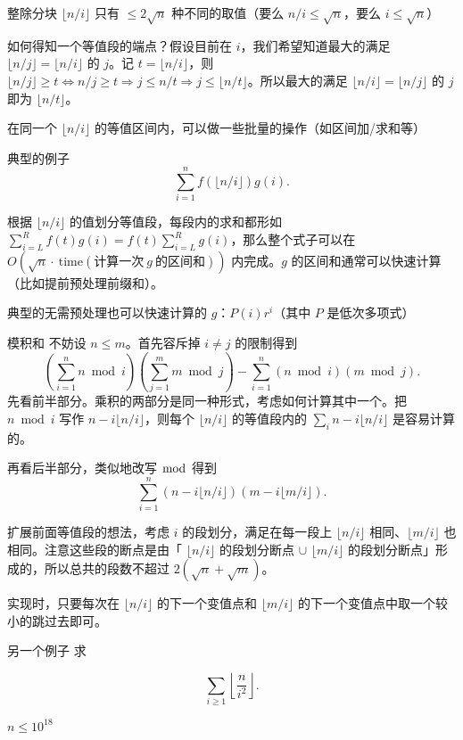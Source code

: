 \begin{frame}{整除分块}
    $\lfloor n/i\rfloor$ 只有 $\le 2\sqrt{n}$ 种不同的取值（要么 $n/i\le \sqrt{n}$，要么 $i\le \sqrt{n}$）

    如何得知一个等值段的端点？假设目前在 $i$，我们希望知道最大的满足 $\lfloor n/j\rfloor=\lfloor n/i\rfloor$ 的 $j$。记 $t=\lfloor n/i\rfloor$，则 $\lfloor n/j\rfloor\ge t\Longleftrightarrow n/j\ge t\Longrightarrow j\le n/t\Longrightarrow j\le\lfloor n/t\rfloor$。所以最大的满足 $\lfloor n/i\rfloor=\lfloor n/j\rfloor$ 的 $j$ 即为 $\lfloor n/t\rfloor$。

    在同一个 $\lfloor n/i\rfloor$ 的等值区间内，可以做一些批量的操作（如区间加/求和等）
\end{frame}
\begin{frame}{典型的例子}
    $$
    \sum_{i=1}^n f(\lfloor n/i\rfloor)g(i).
    $$

    根据 $\lfloor n/i\rfloor$ 的值划分等值段，每段内的求和都形如 $\sum_{i=L}^R f(t)g(i)=f(t)\sum_{i=L}^R g(i)$，那么整个式子可以在 $O(\sqrt{n}\cdot\ \text{time}(\text{计算一次}\ g\ \text{的区间和}))$ 内完成。$g$ 的区间和通常可以快速计算（比如提前预处理前缀和）。
    
    典型的无需预处理也可以快速计算的 $g$：$P(i)r^i$（其中 $P$ 是低次多项式）
\end{frame}
\begin{frame}{模积和}
    不妨设 $n\le m$。首先容斥掉 $i\ne j$ 的限制得到
    $$
    \left(\sum_{i=1}^n n\bmod i\right)\left(\sum_{j=1}^m m\bmod j\right)-\sum_{i=1}^n(n\bmod i)(m\bmod j).
    $$
    先看前半部分。乘积的两部分是同一种形式，考虑如何计算其中一个。把 $n\bmod i$ 写作 $n-i\lfloor n/i\rfloor$，则每个 $\lfloor n/i\rfloor$ 的等值段内的 $\sum_i n-i\lfloor n/i\rfloor$ 是容易计算的。
\end{frame}
\begin{frame}
    再看后半部分，类似地改写 $\bmod$ 得到
    $$
    \sum_{i=1}^n (n-i\lfloor n/i\rfloor)(m-i\lfloor m/i\rfloor).
    $$

    扩展前面等值段的想法，考虑 $i$ 的段划分，满足在每一段上 $\lfloor n/i\rfloor$ 相同、$\lfloor m/i\rfloor$ 也相同。注意这些段的断点是由「 $\lfloor n/i\rfloor$ 的段划分断点 $\cup$ $\lfloor m/i\rfloor$ 的段划分断点」形成的，所以总共的段数不超过 $2(\sqrt{n}+\sqrt{m})$。

    实现时，只要每次在 $\lfloor n/i\rfloor$ 的下一个变值点和 $\lfloor m/i\rfloor$ 的下一个变值点中取一个较小的跳过去即可。
\end{frame}
\begin{frame}{另一个例子}
    求

    $$
    \sum_{i\ge 1}\left\lfloor \frac{n}{i^2}\right\rfloor.
    $$

    $n\le 10^{18}$
\end{frame}
